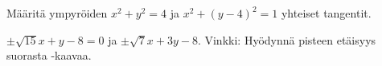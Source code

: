 \begin{tehtavasivu}
\begin{tehtava}
Määritä ympyröiden $x^2+y^2 = 4$ ja $x^2+(y-4)^2 = 1$ yhteiset tangentit.

\begin{vastaus}
$\pm\sqrt{15}x+y-8= 0$ ja $\pm\sqrt{7}x+3y-8$. Vinkki: Hyödynnä pisteen etäisyys suorasta -kaavaa.
\end{vastaus}
\end{tehtava}


\end{tehtavasivu}